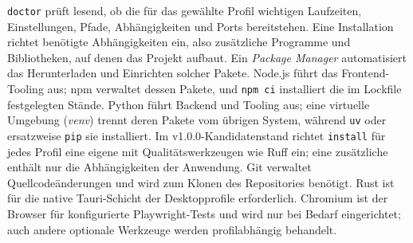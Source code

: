 \begin{beginnerstatement}

\texttt{doctor} prüft lesend, ob die für das gewählte Profil wichtigen
Laufzeiten, Einstellungen, Pfade, Abhängigkeiten und Ports bereitstehen. Eine
Installation richtet benötigte Abhängigkeiten ein, also zusätzliche Programme
und Bibliotheken, auf denen das Projekt aufbaut. Ein \emph{Package Manager}
automatisiert das Herunterladen und Einrichten solcher Pakete. Node.js führt
das Frontend-Tooling aus; npm verwaltet dessen Pakete, und \texttt{npm ci}
installiert die im Lockfile festgelegten Stände. Python führt Backend und
Tooling aus; eine virtuelle Umgebung (\emph{venv}) trennt deren Pakete vom
übrigen System, während \texttt{uv} oder ersatzweise \texttt{pip} sie
installiert. Im v1.0.0-Kandidatenstand richtet \texttt{install} für jedes Profil
eine eigene  mit Qualitätswerkzeugen wie Ruff ein; eine
zusätzliche  enthält nur die Abhängigkeiten der Anwendung.
Git verwaltet Quellcodeänderungen und wird zum Klonen des
Repositories benötigt. Rust ist für die native Tauri-Schicht der
Desktopprofile erforderlich. Chromium ist der Browser für konfigurierte
Playwright-Tests und wird nur bei Bedarf eingerichtet; auch andere optionale
Werkzeuge werden profilabhängig behandelt.

\end{beginnerstatement}
